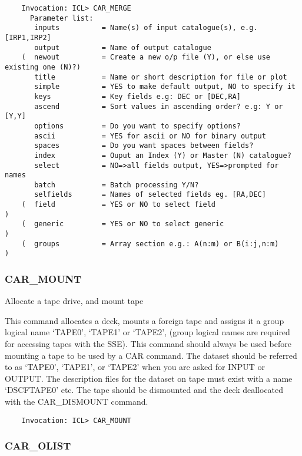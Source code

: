 \begin{verbatim}
    Invocation: ICL> CAR_MERGE
      Parameter list:
       inputs          = Name(s) of input catalogue(s), e.g. [IRP1,IRP2]
       output          = Name of output catalogue
    (  newout          = Create a new o/p file (Y), or else use existing one (N)?)
       title           = Name or short description for file or plot
       simple          = YES to make default output, NO to specify it
       keys            = Key fields e.g: DEC or [DEC,RA]
       ascend          = Sort values in ascending order? e.g: Y or [Y,Y]
       options         = Do you want to specify options?
       ascii           = YES for ascii or NO for binary output
       spaces          = Do you want spaces between fields?
       index           = Ouput an Index (Y) or Master (N) catalogue?
       select          = NO=>all fields output, YES=>prompted for names
       batch           = Batch processing Y/N?
       selfields       = Names of selected fields eg. [RA,DEC]
    (  field           = YES or NO to select field                               )
    (  generic         = YES or NO to select generic                             )
    (  groups          = Array section e.g.: A(n:m) or B(i:j,n:m)                )
\end{verbatim}

\subsubsection{CAR\_MOUNT}

Allocate a tape drive, and mount tape

This command allocates a deck, mounts a foreign tape and assigns it
a group logical name `TAPE0', `TAPE1' or `TAPE2', (group logical names are
required for accessing tapes with the SSE).
This command should always be used before mounting a tape to be used by a CAR
command.
The dataset should be referred to as `TAPE0', `TAPE1', or `TAPE2' when you are
asked for INPUT or OUTPUT.
The description files for the dataset on tape must exist with a name
`DSCFTAPE0' etc.
The tape should be dismounted and the deck deallocated with the CAR\_DISMOUNT
command.
\begin{verbatim}
    Invocation: ICL> CAR_MOUNT
\end{verbatim}
 
\subsubsection{CAR\_OLIST}


